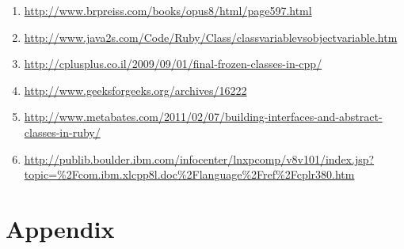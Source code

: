 \documentclass[10pt,a4paper,twocolumn]{article}
\begin{document}
\begin{enumerate}
\item \url{http://www.brpreiss.com/books/opus8/html/page597.html}
\item \url{http://www.java2s.com/Code/Ruby/Class/classvariablevsobjectvariable.htm}
\item \url{http://cplusplus.co.il/2009/09/01/final-frozen-classes-in-cpp/}
\item \url{http://www.geeksforgeeks.org/archives/16222}
\item \url{http://www.metabates.com/2011/02/07/building-interfaces-and-abstract-classes-in-ruby/}
\item \url{http://publib.boulder.ibm.com/infocenter/lnxpcomp/v8v101/index.jsp?topic=\%2Fcom.ibm.xlcpp8l.doc\%2Flanguage\%2Fref\%2Fcplr380.htm}
\end{enumerate}

\pagebreak
\section{Appendix}
















\end{document}
